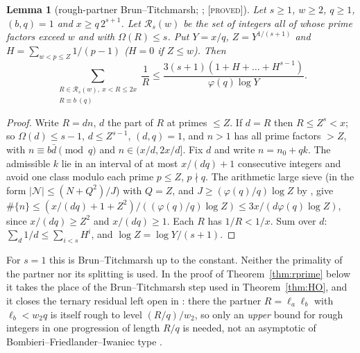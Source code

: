 \documentclass[10pt,reqno]{amsart}
\newtheorem{lemma}[theorem]{Lemma}
\theoremstyle{definition}
\theoremstyle{remark}
\newcommand{\lab}[1]{\textup{[\textsc{#1}]}}
\begin{document}
\begin{lemma}[rough-partner Brun--Titchmarsh; {\cite[Lemma~2.3]{TW4}}; \lab{proved}]\label{lem:roughBT}
Let $s\geq1$, $w\geq2$, $q\geq1$, $(b,q)=1$ and $x\geq q\,2^{s+1}$.  Let
$\mathcal R_s(w)$ be the set of integers all of whose prime factors exceed
$w$ and with $\Omega(R)\leq s$.  Put $Y=x/q$, $Z=Y^{1/(s+1)}$ and
$H=\sum_{w<p\leq Z}1/(p-1)$ ($H=0$ if $Z\leq w$).  Then
\[
 \sum_{\substack{R\in\mathcal R_s(w),\ x<R\leq2x\\ R\equiv b\ (q)}}\frac1R
 \leq\frac{3(s+1)(1+H+\dots+H^{s-1})}{\varphi(q)\log Y}.
\]
\end{lemma}
\begin{proof}
Write $R=dn$, $d$ the part of $R$ at primes $\leq Z$.  If $d=R$ then
$R\leq Z^s<x$; so $\Omega(d)\leq s-1$, $d\leq Z^{s-1}$, $(d,q)=1$, and $n>1$
has all prime factors $>Z$, with $n\equiv b\bar d\pmod q$ and
$n\in(x/d,2x/d]$.  Fix $d$ and write $n=n_0+qk$.  The admissible $k$ lie in
an interval of at most $x/(dq)+1$ consecutive integers and avoid one class
modulo each prime $p\leq Z$, $p\nmid q$.  The arithmetic large sieve
\cite{MV} (in the form $|\mathcal N|\leq(N+Q^2)/J$) with $Q=Z$, and
$J\geq(\varphi(q)/q)\log Z$ by \cite{vLR}, give
$\#\{n\}\leq(x/(dq)+1+Z^2)/((\varphi(q)/q)\log Z)\leq3x/(d\varphi(q)\log Z)$,
since $x/(dq)\geq Z^2$ and $x/(dq)\geq1$.  Each $R$ has $1/R<1/x$.  Sum over
$d$: $\sum_d1/d\leq\sum_{i<s}H^i$, and $\log Z=\log Y/(s+1)$.
\end{proof}
For $s=1$ this is Brun--Titchmarsh up to the constant.  Neither the
primality of the partner nor its splitting is used.  In the proof of
Theorem~\ref{thm:rprime} below it takes the place of the
Brun--Titchmarsh step used in Theorem~\ref{thm:HO}, and it closes the ternary residual left open in \cite[\S6.3]{TW3}: there the
partner $R=\ell_a\ell_b$ with $\ell_b<w_2q$ is itself rough to level
$(R/q)/w_2$, so only an \emph{upper} bound for rough integers in one
progression of length $R/q$ is needed, not an asymptotic of
Bombieri--Friedlander--Iwaniec type \cite[\S2]{TW4}.
\end{document}
